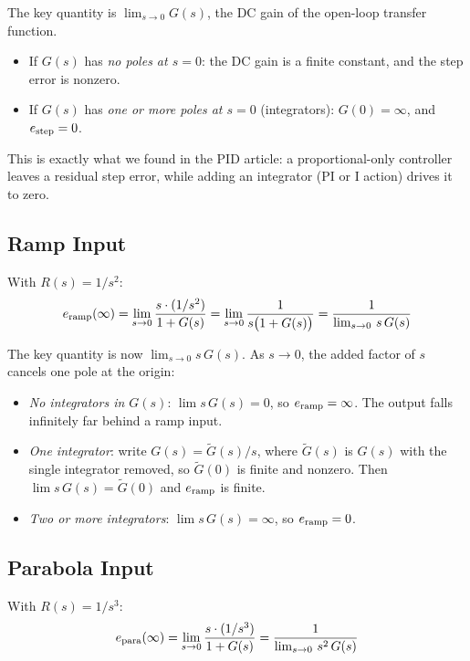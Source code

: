 \documentclass[../../book.tex]{subfiles}
\begin{document}
The key quantity is $\lim_{s\to 0} G(s)$, the DC gain of the open-loop
transfer function.
\begin{itemize}
  \item If $G(s)$ has \emph{no poles at $s = 0$}: the DC gain is a finite
    constant, and the step error is nonzero.
  \item If $G(s)$ has \emph{one or more poles at $s = 0$} (integrators):
    $G(0) = \infty$, and $e_{\rm step} = 0$.
\end{itemize}

This is exactly what we found in the PID article: a proportional-only controller
leaves a residual step error, while adding an integrator (PI or I action) drives
it to zero.

\subsection{Ramp Input}

With $R(s) = 1/s^2$:
\begin{equation}
  e_{\rm ramp}(\infty)
    = \lim_{s \to 0} \frac{s \cdot (1/s^2)}{1 + G(s)}
    = \lim_{s \to 0} \frac{1}{s\bigl(1 + G(s)\bigr)}
    = \frac{1}{\lim_{s \to 0}\, s\,G(s)}
  \label{eq:ess_ramp}
\end{equation}

The key quantity is now $\lim_{s\to 0} s\,G(s)$.  As $s \to 0$, the added
factor of $s$ cancels one pole at the origin:
\begin{itemize}
  \item \emph{No integrators in $G(s)$}: $\lim s\,G(s) = 0$, so
    $e_{\rm ramp} = \infty$.  The output falls infinitely far behind a ramp
    input.
  \item \emph{One integrator}: write $G(s) = \widetilde{G}(s)/s$, where
    $\widetilde{G}(s)$ is $G(s)$ with the single integrator removed, so
    $\widetilde{G}(0)$ is finite and nonzero.  Then $\lim s\,G(s) =
    \widetilde{G}(0)$ and $e_{\rm ramp}$ is finite.
  \item \emph{Two or more integrators}: $\lim s\,G(s) = \infty$, so
    $e_{\rm ramp} = 0$.
\end{itemize}

\subsection{Parabola Input}

With $R(s) = 1/s^3$:
\begin{equation}
  e_{\rm para}(\infty)
    = \lim_{s \to 0} \frac{s \cdot (1/s^3)}{1 + G(s)}
    = \frac{1}{\lim_{s \to 0}\, s^2\,G(s)}
  \label{eq:ess_para}
\end{equation}
\end{document}
